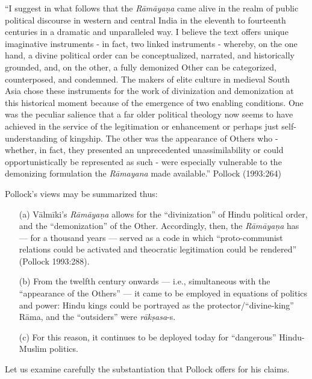 \begin{myquote}
“I suggest in what follows that the {\sl Rāmāyaṇa} came alive in the realm of public political discourse in western and central India in the eleventh to fourteenth centuries in a dramatic and unparalleled way. I believe the text offers unique imaginative instruments - in fact, two linked instruments - whereby, on the one hand, a divine political order can be conceptualized, narrated, and historically grounded, and, on the other, a fully demonized Other can be categorized, counterposed, and condemned. The makers of elite culture in medieval South Asia chose these instruments for the work of divinization and demonization at this historical moment because of the emergence of two enabling conditions. One was the peculiar salience that a far older political theology now seems to have achieved in the service of the legitimation or enhancement or perhaps just self-understanding of kingship. The other was the appearance of Others who - whether, in fact, they presented an unprecedented unassimilability or could opportunistically be represented as such - were especially vulnerable to the demonizing formulation the {\sl Rāmayana} made available.”
\hfill Pollock (1993:264)
\end{myquote}

Pollock’s views may be summarized thus:

\begin{itemize}
\item[(a)] Vālmīki’s {\sl Rāmāyaṇa} allows for the “divinization” of Hindu political order, and the “demonization” of the Other.  Accordingly, then, the {\sl Rāmāyaṇa} has — for a thousand years — served as a code in which “proto-communist relations could be activated and theocratic legitimation could be rendered” (Pollock 1993:288). 

\item[(b)] From the twelfth century onwards — i.e., simultaneous with the “appearance of the Others” — it came to be employed in equations of politics and power: Hindu kings could be portrayed as the protector/“divine-king” Rāma, and the “outsiders” were {\sl rākṣasa}-s.  

\item[(c)] For this reason, it continues to be deployed today for “dangerous” Hindu-Muslim politics. 
\end{itemize}

Let us examine carefully the substantiation that Pollock offers for his claims.

